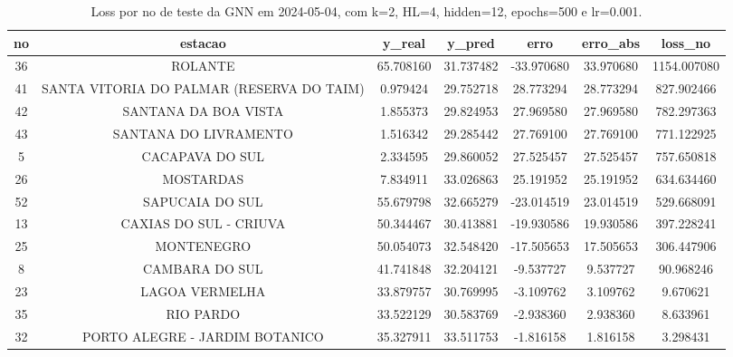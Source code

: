 \begin{table}[h]
\centering
\caption{Loss por no de teste da GNN em 2024-05-04, com k=2, HL=4, hidden=12, epochs=500 e lr=0.001.}
\label{tab:gnn_loss_k2_hl4_h12_e500_d20240504}
\begin{tabular}{ccccccc}
\toprule
no & estacao & y\_real & y\_pred & erro & erro\_abs & loss\_no \\
\midrule
36 & ROLANTE & 65.708160 & 31.737482 & -33.970680 & 33.970680 & 1154.007080 \\
41 & SANTA VITORIA DO PALMAR (RESERVA DO TAIM) & 0.979424 & 29.752718 & 28.773294 & 28.773294 & 827.902466 \\
42 & SANTANA DA BOA VISTA & 1.855373 & 29.824953 & 27.969580 & 27.969580 & 782.297363 \\
43 & SANTANA DO LIVRAMENTO & 1.516342 & 29.285442 & 27.769100 & 27.769100 & 771.122925 \\
5 & CACAPAVA DO SUL & 2.334595 & 29.860052 & 27.525457 & 27.525457 & 757.650818 \\
26 & MOSTARDAS & 7.834911 & 33.026863 & 25.191952 & 25.191952 & 634.634460 \\
52 & SAPUCAIA DO SUL & 55.679798 & 32.665279 & -23.014519 & 23.014519 & 529.668091 \\
13 & CAXIAS DO SUL - CRIUVA & 50.344467 & 30.413881 & -19.930586 & 19.930586 & 397.228241 \\
25 & MONTENEGRO & 50.054073 & 32.548420 & -17.505653 & 17.505653 & 306.447906 \\
8 & CAMBARA DO SUL & 41.741848 & 32.204121 & -9.537727 & 9.537727 & 90.968246 \\
23 & LAGOA VERMELHA & 33.879757 & 30.769995 & -3.109762 & 3.109762 & 9.670621 \\
35 & RIO PARDO & 33.522129 & 30.583769 & -2.938360 & 2.938360 & 8.633961 \\
32 & PORTO ALEGRE - JARDIM BOTANICO & 35.327911 & 33.511753 & -1.816158 & 1.816158 & 3.298431 \\
\bottomrule
\end{tabular}
\end{table}

